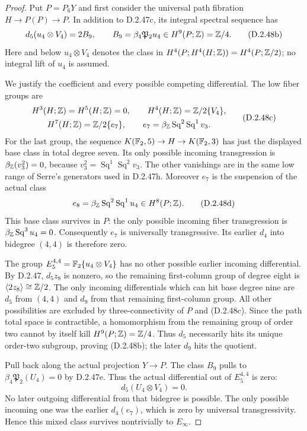 \begin{proof}
Put $P=P_6Y$ and first consider the universal path fibration
$H\to P(P)\to P$. In addition to D.2.47c, its integral
spectral sequence has
\[
 d_5(u_4\otimes V_4)=2B_9,
 \qquad B_9=\beta_4\mathfrak P_2u_4
                 \in H^9(P;\mathbb Z)=\mathbb Z/4.
 \tag{D.2.48b}
\]
Here and below $u_4\otimes V_4$ denotes the class in
$H^4(P;H^4(H;\mathbb Z))=H^4(P;\mathbb Z/2)$; no integral lift of
$u_4$ is assumed.

We justify the coefficient and every possible competing
differential. The low fiber groups are
\[
\begin{gathered}
 H^3(H;\mathbb Z)=H^5(H;\mathbb Z)=0,
 \qquad H^4(H;\mathbb Z)=\mathbb Z/2\{V_4\},\\
 H^7(H;\mathbb Z)=\mathbb Z/2\{e_7\},
 \qquad e_7=\beta_{\mathbb Z}\operatorname{Sq}^2
                         \operatorname{Sq}^1v_3.
\end{gathered}
 \tag{D.2.48c}
\]
For the last group, the sequence
$K(\mathbb F_2,5)\to H\to K(\mathbb F_2,3)$ has just the displayed
base class in total degree seven. Its only possible incoming
transgression is $\beta_{\mathbb Z}(v_3^2)=0$, because
$v_3^2=\operatorname{Sq}^1\operatorname{Sq}^2v_3$.
The other vanishings are in the same low range of Serre's
generators used in D.2.47h. Moreover $e_7$ is the suspension
of the actual class
\[
 e_8=\beta_{\mathbb Z}\operatorname{Sq}^2
                      \operatorname{Sq}^1u_4\in H^8(P;\mathbb Z).
 \tag{D.2.48d}
\]
This base class survives in $P$: the only possible incoming
fiber transgression is
$\beta_{\mathbb Z}\operatorname{Sq}^3u_4=0$.
Consequently $e_7$ is universally transgressive. Its earlier
$d_4$ into bidegree $(4,4)$ is therefore zero.

The group $E_5^{4,4}=\mathbb F_2\{u_4\otimes V_4\}$ has
no other possible earlier incoming differential. By D.2.47,
$d_5z_8$ is nonzero, so the remaining first-column group
of degree eight is $\langle2z_8\rangle\cong\mathbb Z/2$.
The only incoming differentials which can hit base degree
nine are $d_5$ from $(4,4)$ and $d_9$ from that remaining
first-column group. All other possibilities are excluded by
three-connectivity of $P$ and \textup{(D.2.48c)}.
Since the path total space is contractible, a homomorphism
from the remaining group of order two cannot by itself kill
$H^9(P;\mathbb Z)=\mathbb Z/4$. Thus $d_5$ necessarily hits its unique
order-two subgroup, proving \textup{(D.2.48b)}; the later
$d_9$ hits the quotient.

Pull back along the actual projection $Y\to P$. The class
$B_9$ pulls to $\beta_4\mathfrak P_2(U_4)=0$ by D.2.47e.
Thus the actual differential out of $E_5^{4,4}$ is zero:
\[
                  d_5(U_4\otimes V_4)=0.
                  \tag{D.2.48e}
\]
No later outgoing differential from that bidegree is possible.
The only possible incoming one was the earlier $d_4(e_7)$,
which is zero by universal transgressivity. Hence this mixed
class survives nontrivially to $E_\infty$.


\end{proof}
